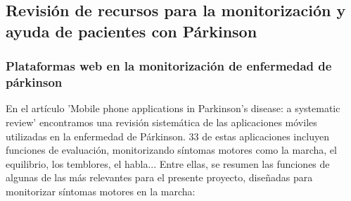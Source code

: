 \subsection{Revisión de recursos para la monitorización y ayuda de pacientes con Párkinson}

\subsubsection{Plataformas web en la monitorización de enfermedad de párkinson}
En el artículo 'Mobile phone applications in Parkinson's disease: a systematic review' \cite{LINARESDELREY201938} encontramos una revisión sistemática de las aplicaciones móviles utilizadas en la enfermedad de Párkinson. 33 de estas aplicaciones incluyen funciones de evaluación, monitorizando síntomas motores como la marcha, el equilibrio, los temblores, el habla... Entre ellas, se resumen las funciones de algunas de las más relevantes para el presente proyecto, diseñadas para monitorizar síntomas motores en la marcha:
